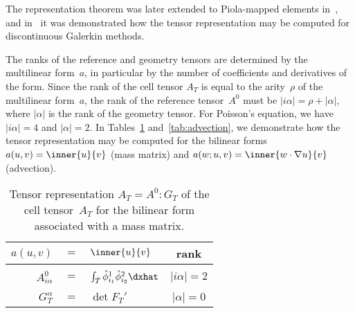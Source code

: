 The representation theorem was later extended to Piola-mapped elements
in~\citet{RognesKirbyLogg2009}, and in~\citet{OelgaardLoggWells2008}
it was demonstrated how the tensor representation may be computed for
discontinuous Galerkin methods.

The ranks of the reference and geometry tensors are determined by the
multilinear form~$a$, in particular by the number of coefficients and
derivatives of the form. Since the rank of the cell tensor $A_T$ is
equal to the arity~$\rho$ of the multilinear form~$a$, the rank of the
reference tensor~$A^0$ must be $|i\alpha| = \rho + |\alpha|$, where
$|\alpha|$ is the rank of the geometry tensor. For Poisson's equation,
we have $|i\alpha| = 4$ and $|\alpha| = 2$. In Tables~\ref{tab:mass}
and~\ref{tab:advection}, we demonstrate how the tensor representation
may be computed for the bilinear forms $a(u, v) = \inner{u}{v}$ (mass
matrix) and $a(w; u, v) = \inner{w \cdot \nabla u}{v}$ (advection).

\begin{table}
  \centering
  \begin{tabular}{rclc}
    \toprule
    $a(u, v)$ &$=$& $\inner{u}{v}$ & rank \\
    \midrule
    &&&\\[-2ex]
    $A^0_{i\alpha}$ &$=$& $\int_{\hat{T}} \hat{\phi}_{i_1}^{1} \hat{\phi}_{i_2}^{2} \dxhat$
    & $|i\alpha| = 2$ \\[1ex]
    &&&\\[-2ex]
    $G_T^{\alpha}$ &$=$& $\det F_T'$
    & $|\alpha| = 0$ \\[1ex]
    \bottomrule
  \end{tabular}
  \caption{Tensor representation $A_T = A^0 : G_T$ of the cell
    tensor~$A_T$ for the bilinear form associated with a mass
    matrix.}
  \label{tab:mass}
\end{table}

